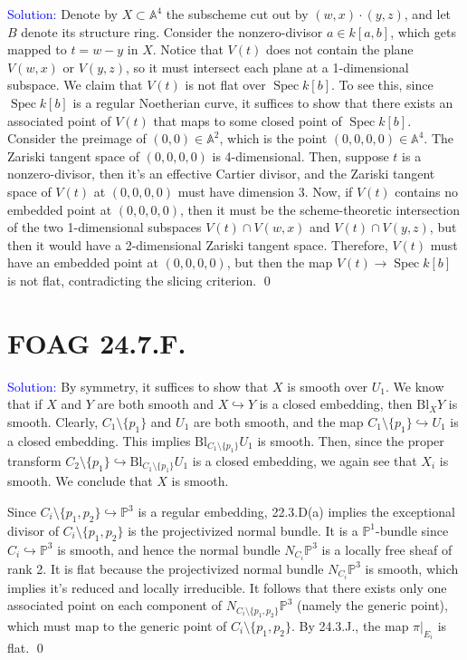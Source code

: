 \documentclass[11pt]{article}
\renewcommand{\AA}{\mathbb{A}}
\newcommand{\PP}{\mathbb{P}}
\DeclareMathOperator{\Spec}{\operatorname{Spec}}
\newcommand{\Bl}{\mathrm{Bl}}
\newenvironment{solution}{\begin{trivlist}\item[]{\textcolor{blue}{Solution:}}}{\qed \end{trivlist}}
\begin{document}
\begin{solution}
    Denote by $X \subset \AA^4$ the subscheme cut out by $(w, x) \cdot (y, z)$, and let $B$ denote its structure ring. 
    Consider the nonzero-divisor $a \in k[a,b]$, which gets mapped to $t = w - y$ in $X$. Notice that $V(t)$ does not contain the plane $V(w, x)$ or $V(y,z)$, so it must intersect each plane at a 1-dimensional subspace. We claim that $V(t)$ is not flat over $\Spec k[b]$. To see this, since $\Spec k[b]$ is a regular Noetherian curve, it suffices to show that there exists an associated point of $V(t)$ that maps to some closed point of $\Spec k[b]$. Consider the preimage of $(0, 0) \in \AA^2$, which is the point $(0, 0, 0, 0) \in \AA^4$. The Zariski tangent space of $(0,0, 0, 0)$ is 4-dimensional. Then, suppose $t$ is a nonzero-divisor, then it's an effective Cartier divisor, and the Zariski tangent space of $V(t)$ at $(0, 0, 0, 0)$ must have dimension 3. Now, if $V(t)$ contains no embedded point at $(0, 0, 0, 0)$, then it must be the scheme-theoretic intersection of the two 1-dimensional subspaces $V(t) \cap V(w,x)$ and $V(t) \cap V(y,z)$, but then it would have a 2-dimensional Zariski tangent space. Therefore, $V(t)$ must have an embedded point at $(0, 0, 0, 0)$, but then the map $V(t) \rightarrow \Spec k[b]$ is not flat, contradicting the slicing criterion. 
\end{solution}

\newpage

\section*{FOAG 24.7.F.}

\begin{solution}
    By symmetry, it suffices to show that $X$ is smooth over $U_1$. We know that if $X$ and $Y$ are both smooth and $X \hookrightarrow Y$ is a closed embedding, then $\Bl_X Y$ is smooth. Clearly, $C_1 \setminus \{p_1\}$ and $U_1$ are both smooth, and the map $C_1 \setminus \{p_1\} \hookrightarrow U_1$ is a closed embedding. This implies $\Bl_{C_1 \setminus \{p_1\}} U_1$ is smooth. Then, since the proper transform $C_2 \setminus \{p_1\} \hookrightarrow \Bl_{C_1 \setminus \{p_1\}} U_1$ is a closed embedding, we again see that $X_i$ is smooth. We conclude that $X$ is smooth. 

    Since $C_i \setminus \{p_1, p_2\} \hookrightarrow \PP^3$ is a regular embedding, 22.3.D(a) implies the exceptional divisor of $C_i \setminus \{p_1, p_2\}$ is the projectivized normal bundle. It is a $\PP^1$-bundle since $C_i \hookrightarrow \PP^3$ is smooth, and hence the normal bundle $N_{C_i} \PP^3$ is a locally free sheaf of rank 2. It is flat because the projectivized normal bundle $N_{C_i} \PP^3$ is smooth, which implies it's reduced and locally irreducible. It follows that there exists only one associated point on each component of $N_{C_i \setminus \{p_1, p_2\}} \PP^3$ (namely the generic point), which must map to the generic point of $C_i \setminus \{p_1, p_2\}$. By 24.3.J., the map $\pi|_{E_i}$ is flat. 
\end{solution}
\end{document}
